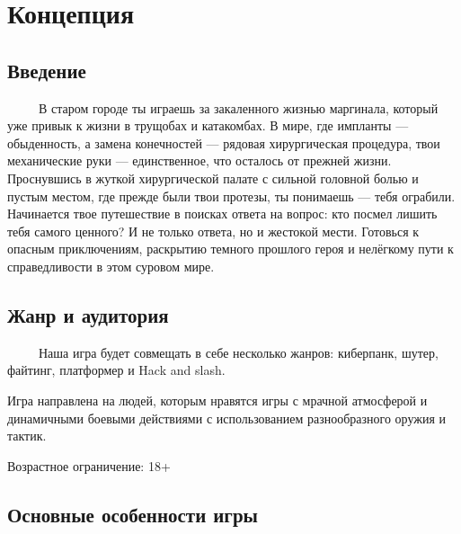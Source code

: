\documentclass{article}
\begin{document}
\section{Концепция}

\subsection{Введение}
\ \ \ \ \ В старом городе ты играешь за закаленного жизнью маргинала, который уже привык к жизни в трущобах и катакомбах. В мире, где импланты — обыденность, а замена конечностей — рядовая хирургическая процедура, твои механические руки — единственное, что осталось от прежней жизни. Проснувшись в жуткой хирургической палате с сильной головной болью и пустым местом, где прежде были твои протезы, ты понимаешь — тебя ограбили. Начинается твое путешествие в поисках ответа на вопрос: кто посмел лишить тебя самого ценного? И не только ответа, но и жестокой мести. Готовься к опасным приключениям, раскрытию темного прошлого героя и нелёгкому пути к справедливости в этом суровом мире.
\subsection{Жанр и аудитория}
\ \ \ \ \ Наша игра будет совмещать в себе несколько жанров: киберпанк, шутер, файтинг, платформер и Hack and slash.

Игра направлена на людей, которым нравятся игры с  мрачной атмосферой и динамичными боевыми действиями с использованием разнообразного оружия и тактик. 

Возрастное ограничение: 18+
\subsection{Основные особенности игры}
\end{document}
